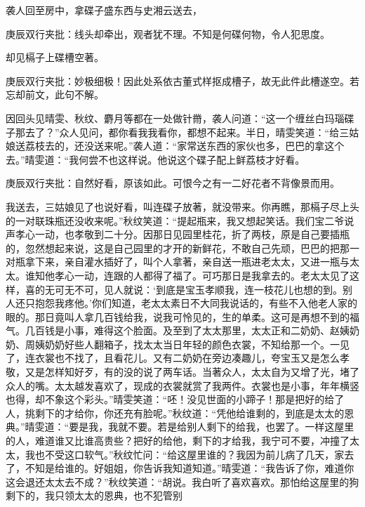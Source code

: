 \begin{parag}
    袭人回至房中，拿碟子盛东西与史湘云送去，\begin{note}庚辰双行夹批：线头却牵出，观者犹不理。不知是何碟何物，令人犯思度。\end{note}却见槅子上碟槽空著。\begin{note}庚辰双行夹批：妙极细极！因此处系依古董式样抠成槽子，故无此件此槽遂空。若忘却前文，此句不解。\end{note}因回头见晴雯、秋纹、麝月等都在一处做针黹，袭人问道：“这一个缠丝白玛瑙碟子那去了？”众人见问，都你看我我看你，都想不起来。半日，晴雯笑道：“给三姑娘送荔枝去的，还没送来呢。”袭人道：“家常送东西的家伙也多，巴巴的拿这个去。”晴雯道：“我何尝不也这样说。他说这个碟子配上鲜荔枝才好看。\begin{note}庚辰双行夹批：自然好看，原该如此。可恨今之有一二好花者不背像景而用。\end{note}我送去，三姑娘见了也说好看，叫连碟子放著，就没带来。你再瞧，那槅子尽上头的一对联珠瓶还没收来呢。”秋纹笑道：“提起瓶来，我又想起笑话。我们宝二爷说声孝心一动，也孝敬到二十分。因那日见园里桂花，折了两枝，原是自己要插瓶的，忽然想起来说，这是自己园里的才开的新鲜花，不敢自己先顽，巴巴的把那一对瓶拿下来，亲自灌水插好了，叫个人拿著，亲自送一瓶进老太太，又进一瓶与太太。谁知他孝心一动，连跟的人都得了福了。可巧那日是我拿去的。老太太见了这样，喜的无可无不可，见人就说：‘到底是宝玉孝顺我，连一枝花儿也想的到。别人还只抱怨我疼他。’你们知道，老太太素日不大同我说话的，有些不入他老人家的眼的。那日竟叫人拿几百钱给我，说我可怜见的，生的单柔。这可是再想不到的福气。几百钱是小事，难得这个脸面。及至到了太太那里，太太正和二奶奶、赵姨奶奶、周姨奶奶好些人翻箱子，找太太当日年轻的颜色衣裳，不知给那一个。一见了，连衣裳也不找了，且看花儿。又有二奶奶在旁边凑趣儿，夸宝玉又是怎么孝敬，又是怎样知好歹，有的没的说了两车话。当著众人，太太自为又增了光，堵了众人的嘴。太太越发喜欢了，现成的衣裳就赏了我两件。衣裳也是小事，年年横竖也得，却不象这个彩头。”晴雯笑道：“呸！没见世面的小蹄子！那是把好的给了人，挑剩下的才给你，你还充有脸呢。”秋纹道：“凭他给谁剩的，到底是太太的恩典。”晴雯道：“要是我，我就不要。若是给别人剩下的给我，也罢了。一样这屋里的人，难道谁又比谁高贵些？把好的给他，剩下的才给我，我宁可不要，冲撞了太太，我也不受这口软气。”秋纹忙问：“给这屋里谁的？我因为前儿病了几天，家去了，不知是给谁的。好姐姐，你告诉我知道知道。”晴雯道：“我告诉了你，难道你这会退还太太去不成？”秋纹笑道：“胡说。我白听了喜欢喜欢。那怕给这屋里的狗剩下的，我只领太太的恩典，也不犯管别
\end{parag}
